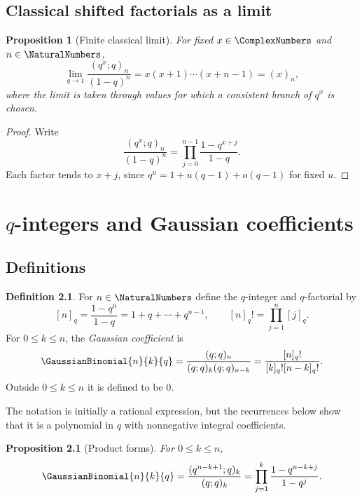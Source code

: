 \documentclass[11pt,a4paper,oneside,openany]{book}
\newtheorem{proposition}[proposition]{Proposition}
\theoremstyle{definition}
\newtheorem{definition}[definition]{Definition}
\theoremstyle{remark}
\begin{document}
\section{Classical shifted factorials as a limit}

\begin{proposition}[Finite classical limit]\label{prop:classical-poch-limit}
For fixed $x\in\ComplexNumbers$ and $n\in\NaturalNumbers$,
\[
 \lim_{q\to1}\frac{(q^x;q)_n}{(1-q)^n}
 =x(x+1)\cdots(x+n-1)=(x)_n,
\]
where the limit is taken through values for which a consistent branch of $q^x$ is chosen.
\end{proposition}

\begin{proof}
Write
\[
 \frac{(q^x;q)_n}{(1-q)^n}
 =\prod_{j=0}^{n-1}\frac{1-q^{x+j}}{1-q}.
\]
Each factor tends to $x+j$, since $q^u=1+u(q-1)+o(q-1)$ for fixed $u$.
\end{proof}

\chapter{\texorpdfstring{$q$}{q}-integers and Gaussian coefficients}\label{chap:gaussian}

\section{Definitions}

\begin{definition}
For $n\in\NaturalNumbers$ define the $q$-integer and $q$-factorial by
\[
 [n]_q=\frac{1-q^n}{1-q}=1+q+\cdots+q^{n-1},
 \qquad
 [n]_q!=\prod_{j=1}^{n}[j]_q.
\]
For $0\le k\le n$, the \emph{Gaussian coefficient} is
\[
 \GaussianBinomial{n}{k}{q}
 =\frac{(q;q)_n}{(q;q)_k(q;q)_{n-k}}
 =\frac{[n]_q!}{[k]_q![n-k]_q!}.
\]
Outside $0\le k\le n$ it is defined to be $0$.
\end{definition}

The notation is initially a rational expression, but the recurrences below show that it is a polynomial in $q$ with nonnegative integral coefficients.

\begin{proposition}[Product forms]\label{prop:qbinom-products}
For $0\le k\le n$,
\[
 \GaussianBinomial{n}{k}{q}
 =\frac{(q^{n-k+1};q)_k}{(q;q)_k}
 =\prod_{j=1}^{k}\frac{1-q^{n-k+j}}{1-q^j}.
\]
\end{proposition}
\end{document}
